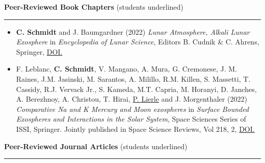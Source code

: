 \documentclass[12pt]{report}
\begin{document}
\vspace{2 mm}
\noindent\textbf{Peer-Reviewed Book Chapters} (students underlined) \rm\hspace*{\fill} \\
\rule{\textwidth}{1pt}
\begin{itemize} \itemsep -2pt %
  \item \textbf{C. Schmidt} and J. Baumgardner (2022) \textit{Lunar Atmosphere, Alkali Lunar Exosphere} in \textit{Encyclopedia of Lunar Science}, Editors B. Cudnik \& C. Ahrens, Springer, \href{https://doi.org/10.1007/978-3-319-05546-6_230-1}{DOI.}
  \item F. Leblanc, \textbf{C. Schmidt}, V. Mangano, A. Mura, G. Cremonese, J. M. Raines, J.M. Jasinski, M. Sarantos, A. Milillo, R.M. Killen, S. Massetti, T. Cassidy, R.J. Vervack Jr., S. Kameda, M.T. Capria, M. Horanyi, D. Janches, A. Berezhnoy, A. Christou, T. Hirai, \underline{P. Lierle} and J. Morgenthaler (2022) \textit{Comparative Na and K Mercury and Moon exospheres} in \textit{Surface Bounded Exospheres and Interactions in the Solar System}, Space Sciences Series of ISSI, Springer. Jointly published in Space Science Reviews, Vol 218, 2, \href{ https://doi.org/10.1007/s11214-022-00871-w}{DOI.}
 \end{itemize}
\vspace{2 mm}
\noindent\textbf{Peer-Reviewed Journal Articles} (students underlined) \rm\hspace*{\fill} \\
\rule{\textwidth}{1pt}
\end{document}
